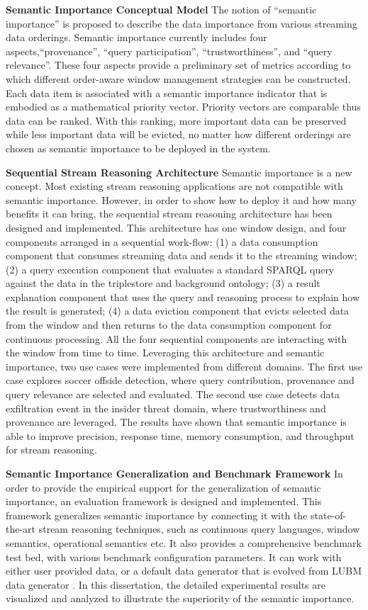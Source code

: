 \textbf{Semantic Importance Conceptual Model}
The notion of ``semantic importance'' is proposed to describe the data importance from various streaming data orderings. 
Semantic importance currently includes four aspects,``provenance'', ``query participation'', ``trustworthiness'', and ``query relevance''.
These four aspects provide a preliminary set of metrics according to which different order-aware window management strategies can be constructed.
Each data item is associated with a semantic importance indicator that is embodied as a mathematical priority vector.
Priority vectors are comparable thus data can be ranked.
With this ranking, more important data can be preserved while less important data will be evicted, no matter how different orderings are chosen as semantic importance to be deployed in the system.

\textbf{Sequential Stream Reasoning Architecture}
Semantic importance is a new concept.
Most existing stream reasoning applications are not compatible with semantic importance.
However, in order to show how to deploy it and how many benefits it can bring, the sequential stream reasoning architecture has been designed and implemented.
This architecture has one window design, and four components arranged in a sequential work-flow: 
(1) a data consumption component that consumes streaming data and sends it to the streaming window;
(2) a query execution component that evaluates a standard SPARQL query against the data in the triplestore and background ontology; 
(3) a result explanation component that uses the query and reasoning process to explain how the result is generated;
(4) a data eviction component that evicts selected data from the window and then returns to the data consumption component for continuous processing.  
All the four sequential components are interacting with the window from time to time.
Leveraging this architecture and semantic importance, two use cases were implemented from different domains. 
The first use case explores soccer offside detection, where query contribution, provenance and query relevance are selected and evaluated. 
The second use case detects data exfiltration event in the insider threat domain, where trustworthiness and provenance are leveraged.
The results have shown that semantic importance is able to improve precision, response time, memory consumption, and throughput for stream reasoning.

\textbf{Semantic Importance Generalization and Benchmark Framework}
In order to provide the empirical support for the generalization of semantic importance, an evaluation framework is designed and implemented.
This framework generalizes semantic importance by connecting it with the state-of-the-art stream reasoning techniques, such as continuous query languages, window semantics, operational semantics etc. 
It also provides a comprehensive benchmark test bed, with various benchmark configuration parameters. 
It can work with either user provided data, or a default data generator that is evolved from LUBM data generator \cite{guo2005lubm}.
In this dissertation, the detailed experimental results are visualized and analyzed to illustrate the superiority of the semantic importance.